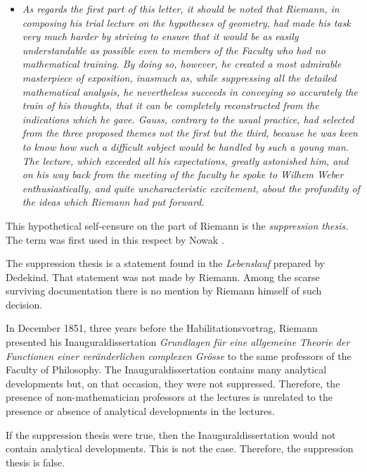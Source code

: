\documentclass[12pt]{article}
\begin{document}
\begin{itemize}

\item[]{\it As regards the first part of this letter, it should be noted that Riemann, in composing his trial lecture on the hypotheses of geometry, had made his task very much harder by striving to ensure that it would be as easily understandable as possible even to members of the Faculty who had no mathematical training. By doing so, however, he created a most admirable masterpiece of exposition, inasmuch as, while suppressing all the detailed mathematical analysis, he nevertheless succeeds in conveying so accurately the train of his thoughts, that it can be completely reconstructed from the indications which he gave. Gauss, contrary to the usual practice, had selected from the three proposed themes not the first but the third, because he was keen to know how such a difficult subject would be handled by such a young man. The lecture, which exceeded all his expectations, greatly astonished him, and on his way back from the meeting of the faculty he spoke to Wilhem Weber enthusiastically, and quite uncharacteristic excitement, about the profundity of the ideas which Riemann had put forward.}

\end{itemize}

\noindent This hypothetical self-censure on the part of Riemann is the {\it suppression thesis}. The term was first used in this respect by Nowak \cite{Nowak1989}.

The suppression thesis is a statement found in the {\it Lebenslauf} prepared by Dedekind. That statement was not made by Riemann. Among the scarse surviving documentation there is no mention by Riemann himself of such decision.

In December 1851, three years before the Habilitationsvortrag, Riemann presented his Inauguraldissertation {\it Grundlagen f\"ur eine allgemeine Theorie der Functionen einer ver\"anderlichen complexen Gr\"osse} \cite{Riemann1851} to the same professors of the Faculty of Philosophy. The Inauguraldissertation contains many analytical developments but, on that occasion, they were not suppressed. Therefore, the presence of non-mathematician professors at the lectures is unrelated to the presence or absence of analytical developments in the lectures. 

If the suppression thesis were true, then the Inauguraldissertation would not contain analytical developments. This is not the case. Therefore, the suppression thesis is false.
\end{document}
